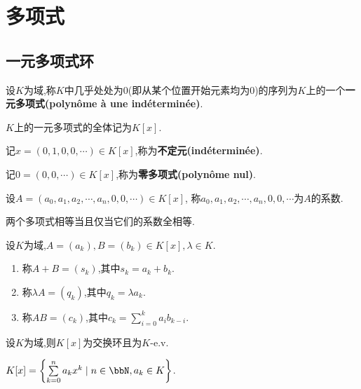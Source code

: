 \chapter{多项式}

\section{一元多项式环}

\begin{deff}
    设$K$为域,称$K$中几乎处处为0(即从某个位置开始元素均为0)的序列为$K$上的一个\textbf{一元多项式(polynôme à une indéterminée)}.

    $K$上的一元多项式的全体记为$K[x]$.
\end{deff}

\begin{rqq}
    记$x = (0, 1, 0, 0, \cdots) \in K[x]$,称为\textbf{不定元(indéterminée)}.

    记$0 = (0, 0, \cdots) \in K[x]$,称为\textbf{零多项式(polynôme nul)}.
\end{rqq}

\begin{rqq}
    设$A = (a_0, a_1, a_2, \cdots, a_n, 0, 0, \cdots) \in K[x]$,
    称$a_0, a_1, a_2, \cdots, a_n, 0, 0, \cdots$为$A$的系数.

    两个多项式相等当且仅当它们的系数全相等.
\end{rqq}

\begin{deff}\label{def:polynomial_operations}
    设$K$为域,$A = (a_k), B = (b_k) \in K[x], \lambda \in K$.
    \begin{enumerate}
        \item 称$A + B = (s_k)$,其中$s_k = a_k + b_k$.
        \item 称$\lambda A = (q_k)$,其中$q_k = \lambda a_k$.
        \item 称$AB = (c_k)$,其中$c_k = \sum\limits_{i = 0}^k a_i b_{k - i}$.\label{def:polynomial_multiplication}
    \end{enumerate}
\end{deff}

\begin{prop}
    设$K$为域,则$K[x]$为交换环且为$K$-e.v.
\end{prop}

\begin{prop}
    $K[x] = \left\{ \sum\limits_{k = 0} ^ n a_k x ^ k \mid n \in \bbN, a_k \in K \right\}$.
\end{prop}

